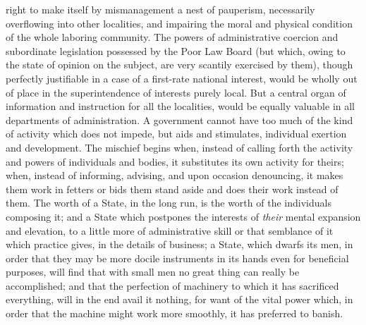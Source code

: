 \documentclass[12pt]{report}
\begin{document}
right to make itself by mismanagement a nest of pauperism, necessarily overflowing into other localities, and impairing the moral and physical condition of the whole laboring community. The powers of administrative coercion and subordinate legislation possessed by the Poor Law Board (but which, owing to the state of opinion on the subject, are very scantily exercised by them), though perfectly justifiable in a case of a first-rate national interest, would be wholly out of place in the superintendence of interests purely local. But a central organ of information and instruction for all the localities, would be equally valuable in all departments of administration. A government cannot have too much of the kind of activity which does not impede, but aids and stimulates, individual exertion and development. The mischief begins when, instead of calling forth the activity and powers of individuals and bodies, it substitutes its own activity for theirs; when, instead of informing, advising, and upon occasion denouncing, it makes them work in fetters or bids them stand aside and does their work instead of them. The worth of a State, in the long run, is the worth of the individuals composing it; and a State which postpones the interests of \emph{their} mental expansion and elevation, to a little more of administrative skill or that semblance of it which practice gives, in the details of business; a State, which dwarfs its men, in order that they may be more docile instruments in its hands even for beneficial purposes, will find that with small men no great thing can really be accomplished; and that the perfection of machinery to which it has sacrificed everything, will in the end avail it nothing, for want of the vital power which, in order that the machine might work more smoothly, it has preferred to banish.
\end{document}
